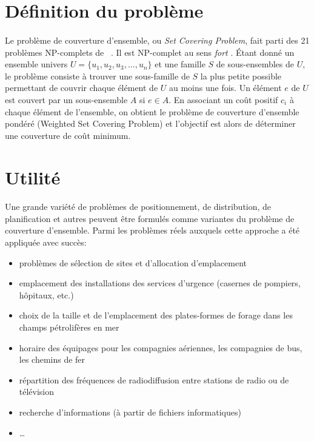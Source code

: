 \documentclass[12pt,letterpaper,twoside]{article}
\begin{document}
	\maketitle{}
	\section{Définition du problème}
		\paragraph*{}
			Le problème de couverture d'ensemble, ou \emph{Set Covering Problem},
			fait parti des 21 problèmes NP-complets de \citeauthor{Karp1972}~\cite{Karp1972}.
			Il est NP-complet au sens \emph{fort} \cite{garey2002computers}.
			Étant donné un ensemble univers \(U = \{u_1, u_2, u_3, \dots, u_n\}\) et une famille \(S\) de sous-ensembles de \(U\),
			le problème consiste à trouver une sous-famille de \(S\) la plus petite possible permettant de couvrir chaque élément de \(U\)
			au moins une fois. Un élément \(e\) de \(U\) est couvert par un sous-ensemble \(A\) si \(e \in A\). En associant un coût positif \(c_i\)
			à chaque élément de l'ensemble, on obtient le problème de couverture d'ensemble pondéré (Weighted Set Covering Problem) et
			l'objectif est alors de déterminer une couverture de coût minimum.~\cite{Vazirani2003}
	\section{Utilité}
		\paragraph*{}
			Une grande variété de problèmes de positionnement, de distribution, de planification et autres peuvent être formulés comme variantes du problème de couverture d'ensemble. Parmi les problèmes réels auxquels cette approche a été appliquée avec succès:\cite{Balas1982}
			\begin{itemize}
				\item problèmes de sélection de sites et d'allocation d'emplacement
				\item emplacement des installations des services d'urgence (casernes de pompiers, hôpitaux, etc.)
				\item choix de la taille et de l'emplacement des plates-formes de forage dans les champs pétrolifères en mer
				\item horaire des équipages pour les compagnies aériennes, les compagnies de bus, les chemins de fer
				\item répartition des fréquences de radiodiffusion entre stations de radio ou de télévision
				\item recherche d'informations (à partir de fichiers informatiques)
				\item \ldots
			\end{itemize}
\end{document}
